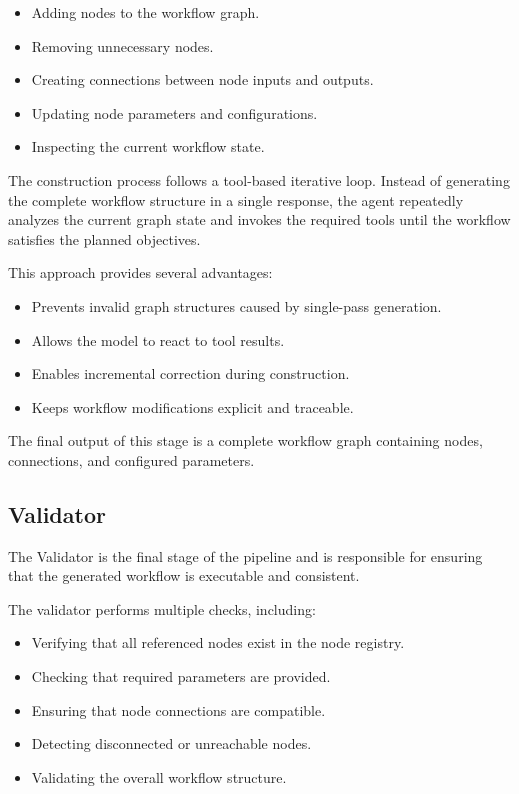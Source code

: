 \begin{itemize}
    \item Adding nodes to the workflow graph.
    \item Removing unnecessary nodes.
    \item Creating connections between node inputs and outputs.
    \item Updating node parameters and configurations.
    \item Inspecting the current workflow state.
\end{itemize}

The construction process follows a tool-based iterative loop. Instead of generating the complete workflow structure in a single response, the agent repeatedly analyzes the current graph state and invokes the required tools until the workflow satisfies the planned objectives.

This approach provides several advantages:

\begin{itemize}
    \item Prevents invalid graph structures caused by single-pass generation.
    \item Allows the model to react to tool results.
    \item Enables incremental correction during construction.
    \item Keeps workflow modifications explicit and traceable.
\end{itemize}

The final output of this stage is a complete workflow graph containing nodes, connections, and configured parameters.

\subsection{Validator}

The Validator is the final stage of the pipeline and is responsible for ensuring that the generated workflow is executable and consistent.

The validator performs multiple checks, including:

\begin{itemize}
    \item Verifying that all referenced nodes exist in the node registry.
    \item Checking that required parameters are provided.
    \item Ensuring that node connections are compatible.
    \item Detecting disconnected or unreachable nodes.
    \item Validating the overall workflow structure.
\end{itemize}

